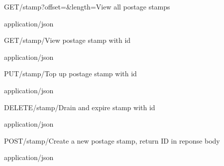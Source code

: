 
\begin{apiRoute}{GET}{/stamp?offset=\&length=}{View all postage stamps}{
}{ }
\begin{queryParameter} 
\end{queryParameter}

\begin{routeResponse}{application/json}
\end{routeResponse}
\end{apiRoute}



\begin{apiRoute}{GET}{/stamp/}{View postage stamp with id}{
}{ }

\begin{routeParameter} 
\end{routeParameter}
\begin{routeResponse}{application/json}
\end{routeResponse}
\end{apiRoute}




\begin{apiRoute}{PUT}{/stamp/}{Top up postage stamp with id}{
}{ }

\begin{routeParameter} 
\end{routeParameter}
\begin{queryParameter} 
\end{queryParameter}

\begin{routeResponse}{application/json}
\end{routeResponse}
\end{apiRoute}



\begin{apiRoute}{DELETE}{/stamp/}{Drain and expire stamp with id}{
}{ }

\begin{routeParameter} 
\end{routeParameter}
\begin{routeResponse}{application/json}
\end{routeResponse}
\end{apiRoute}


\begin{apiRoute}{POST}{/stamp/}{Create a new postage stamp, return ID in reponse body}{
}{ }

\begin{routeParameter} 
\end{routeParameter}
\begin{routeResponse}{application/json}
\end{routeResponse}
\end{apiRoute}
